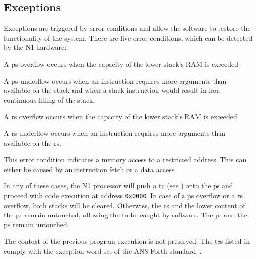 \subsection{Exceptions}
\label{reset:excpt}
Exceptions are triggered by error conditions and allow the software to restore the functionality
of the system. There are five error conditions, which can be detected by the N1 hardware:
\begin{description}[style=nextline]
\item[\Gls{ps} overflow]
  A \gls{ps} overflow occurs when the capacity of the lower stack's RAM is exceeded
\item[\Gls{rs} stack underflow]
  A \gls{ps} underflow occurs when an instruction requires more arguments than
  available on the \gls{stack} and when a stack instruction would result in non-continuous filling
  of the stack.
\item[\Gls{rs} overflow]
  A \gls{rs} overflow occurs when the capacity of the lower stack's RAM is exceeded
\item[\Gls{rs} underflow]
  A \gls{rs} underflow occurs when an instruction requires more arguments than
  available on the \gls{rs}.
\item[Address out of range]
  This error condition indicates a memory access to a restricted address. This can either
  be caused by an instruction fetch or a data access
\end{description}
In any of these cases, the N1 processor will push a \gls{tc} (see ) onto
the \gls{ps} and proceed with code execution at address \texttt{0x0000}.
In case of a \gls{ps} overflow or a \gls{rs} overflow, both stacks will be cleared.
Otherwise, the \gls{rs} and the lower content of the \gls{ps} remain untouched,
allowing the to be caught by software. 
The \gls{ps} and the \gls{ps} remain untouched.

The context of the previous program execution is not preserved.
The \glspl{tc} listed in  comply with the exception word set of
the ANS Forth standard~\cite{dpans94}.


